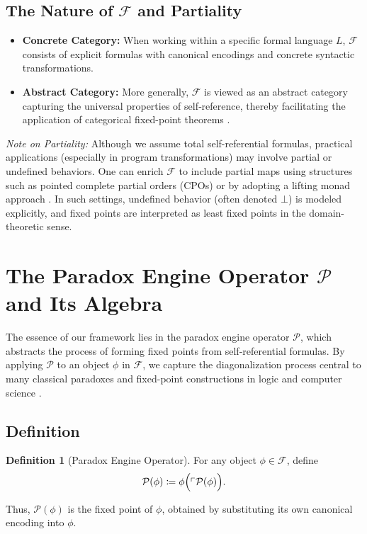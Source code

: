 \documentclass[12pt]{amsart}
\theoremstyle{plain}
\theoremstyle{definition}
\newtheorem{definition}[theorem]{Definition}
\theoremstyle{remark}
\begin{document}
\subsection{The Nature of $\mathcal{F}$ and Partiality}
\begin{itemize}[leftmargin=*, label={\textbullet}]
    \item \textbf{Concrete Category:} When working within a specific formal language $L$, $\mathcal{F}$ consists of explicit formulas with canonical encodings and concrete syntactic transformations.
    \item \textbf{Abstract Category:} More generally, $\mathcal{F}$ is viewed as an abstract category capturing the universal properties of self‐reference, thereby facilitating the application of categorical fixed-point theorems \cite{Awodey2010}.
\end{itemize}
\emph{Note on Partiality:} Although we assume total self-referential formulas, practical applications (especially in program transformations) may involve partial or undefined behaviors. One can enrich $\mathcal{F}$ to include partial maps using structures such as pointed complete partial orders (CPOs) or by adopting a lifting monad approach \cite{Scott1970,Moggi1991}. In such settings, undefined behavior (often denoted $\bot$) is modeled explicitly, and fixed points are interpreted as least fixed points in the domain-theoretic sense.

\section{The Paradox Engine Operator $\mathcal{P}$ and Its Algebra}

The essence of our framework lies in the paradox engine operator $\mathcal{P}$, which abstracts the process of forming fixed points from self‐referential formulas. By applying $\mathcal{P}$ to an object $\phi$ in $\mathcal{F}$, we capture the diagonalization process central to many classical paradoxes and fixed-point constructions in logic and computer science \cite{Gödel1931,Barendregt1984}.

\subsection{Definition}
\begin{definition}[Paradox Engine Operator]
For any object $\phi\in \mathcal{F}$, define
\[
\mathcal{P}(\phi) \coloneqq \phi\Bigl(\ulcorner \mathcal{P}(\phi) \Bigr).
\]
\end{definition}
Thus, $\mathcal{P}(\phi)$ is the fixed point of $\phi$, obtained by substituting its own canonical encoding into $\phi$.
\end{document}
